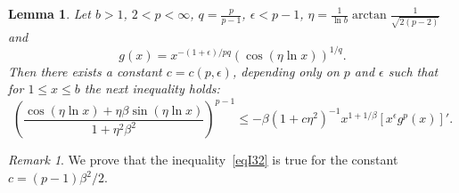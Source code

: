 \documentclass{amsart}
\newtheorem{lemma}[theorem]{Lemma}
\theoremstyle{definition}
\theoremstyle{remark}
\newtheorem{remark}[theorem]{Remark}
\numberwithin{equation}{section}
\begin{document}
\begin{lemma} \label{lem3}
	Let $b>1$, $2< p<\infty$, $q=\frac{p}{p-1}$,  $\epsilon< p-1$, %
	$\eta=\frac{1}{\ln b}\arctan{\frac{1}{\sqrt{2(p-2)}}}$ and
\begin{equation*}\label{eql31}
g(x)=x^{-(1+\epsilon)/pq}\left(\cos(\eta\ln x) \right)^{1/q}.
\end{equation*}
	Then 
	there exists a constant $c=c(p,\epsilon)$, depending only on $p$ and $\epsilon$ such that
	 for $1\le x\le b$  the next inequality holds:
\begin{equation}\label{eqI32}
\left(\frac{\cos(\eta\ln x)+\eta \beta\sin(\eta\ln x)}{1+\eta^2\beta^2} \right)^{p-1}\le
-\beta \left(1+c\eta^2 \right)^{-1}x^{1+1/\beta}\left[x^\epsilon g^p(x) \right]'.
\end{equation}
	\end{lemma}
\begin{remark}
We prove that the inequality~\eqref{eqI32} is true for the constant $c= (p-1)\beta^2/2$.
\end{remark}	
\end{document}
